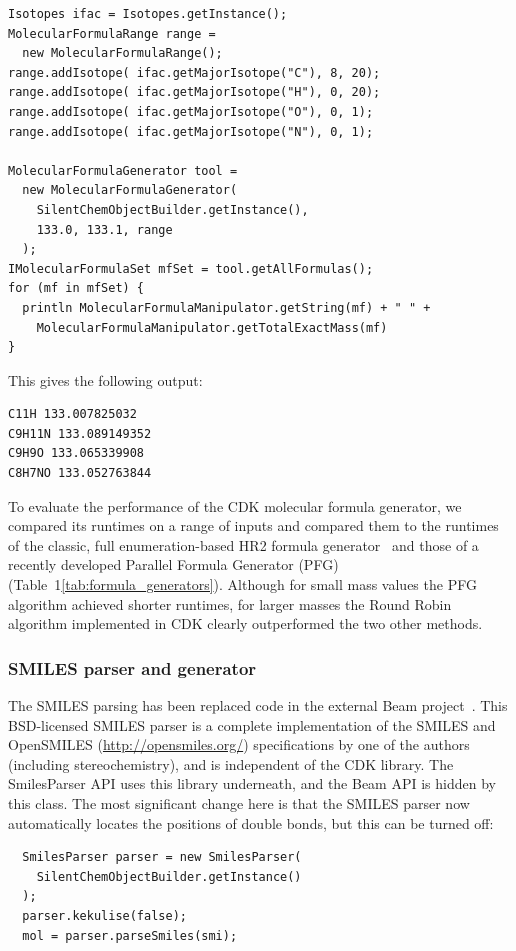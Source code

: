 \documentclass[10pt]{bmcart}
\begin{document}
\begin{verbatim}
Isotopes ifac = Isotopes.getInstance();
MolecularFormulaRange range =
  new MolecularFormulaRange();
range.addIsotope( ifac.getMajorIsotope("C"), 8, 20);
range.addIsotope( ifac.getMajorIsotope("H"), 0, 20);
range.addIsotope( ifac.getMajorIsotope("O"), 0, 1);
range.addIsotope( ifac.getMajorIsotope("N"), 0, 1);

MolecularFormulaGenerator tool =
  new MolecularFormulaGenerator(
    SilentChemObjectBuilder.getInstance(),
    133.0, 133.1, range
  );
IMolecularFormulaSet mfSet = tool.getAllFormulas();
for (mf in mfSet) {
  println MolecularFormulaManipulator.getString(mf) + " " +
    MolecularFormulaManipulator.getTotalExactMass(mf)
}
\end{verbatim}

This gives the following output:

\begin{verbatim}
C11H 133.007825032
C9H11N 133.089149352
C9H9O 133.065339908
C8H7NO 133.052763844
\end{verbatim}

   To evaluate the performance of the CDK molecular formula generator, we
compared its runtimes on a range of inputs and compared them to the runtimes of
the classic, full enumeration-based HR2 formula generator~\cite{Kind2007} and
those of a recently developed Parallel Formula Generator (PFG)~\cite{Zhang2016}
(Table~1\ref{tab:formula_generators}). Although for small mass values the PFG
algorithm achieved shorter runtimes, for larger masses the Round Robin
algorithm implemented in CDK clearly outperformed the two other methods.


  \subsubsection*{SMILES parser and generator}

  The SMILES parsing has been replaced code in the external Beam project~\cite{Beam}.
  This BSD-licensed SMILES parser is a complete implementation of the SMILES
  and OpenSMILES (\url{http://opensmiles.org/}) specifications by one of the
  authors (including stereochemistry), and is independent of
  the CDK library. The SmilesParser API uses this library underneath, and the
  Beam API is hidden by this class. The most significant change here is that
  the SMILES parser now automatically locates the positions of double bonds,
  but this can be turned off:

\begin{verbatim}
  SmilesParser parser = new SmilesParser(
    SilentChemObjectBuilder.getInstance()
  );
  parser.kekulise(false);
  mol = parser.parseSmiles(smi);
\end{verbatim}
\end{document}
